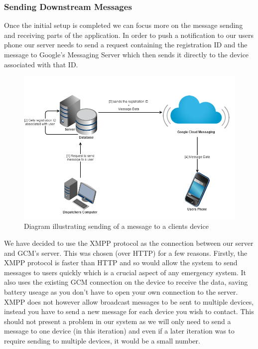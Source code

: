 \documentclass{article}
\begin{document}
	
		\subsubsection{Sending Downstream Messages}
		Once the initial setup is completed we can focus more on the message sending and receiving parts of the application. In order to push a notification to our users phone our server needs to send a request containing the registration ID and the message to Google’s Messaging Server which then sends it directly to the device associated with that ID.\\

	\begin{figure}[H]
		\centering
		\includegraphics[width=1\textwidth]{"Sending a message via GCM - Iteration 0"}
		\caption{Diagram illustrating sending of a message to a clients device}
	\end{figure}
	
	We have decided to use the XMPP protocol as the connection between our server and GCM’s server. This was chosen (over HTTP) for a few reasons. Firstly, the XMPP protocol is faster than HTTP and so would allow the system to send messages to users quickly which is a crucial aspect of any emergency system. It also uses the existing GCM connection on the device to receive the data, saving battery useage as you don't have to open your own connection to the server. XMPP does not however allow broadcast messages to be sent to multiple devices, instead you have to send a new message for each device you wish to contact. This should not present a problem in our system as we will only need to send a message to one device (in this iteration) and even if a later iteration was to require sending to multiple devices, it would be a small number.\\
	
\end{document}
